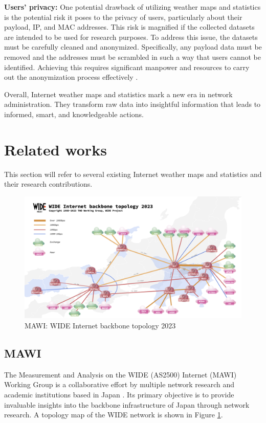 \documentclass[sigconf,authorversion,nonacm]{acmart}
\begin{document}
\textbf{Users' privacy:} One potential drawback of utilizing weather maps and statistics is the potential risk it poses to the privacy of users, particularly about their payload, IP, and MAC addresses. This risk is magnified if the collected datasets are intended to be used for research purposes. To address this issue, the datasets must be carefully cleaned and anonymized. Specifically, any payload data must be removed and the addresses must be scrambled in such a way that users cannot be identified. Achieving this requires significant manpower and resources to carry out the anonymization process effectively \cite{271335}.

Overall, Internet weather maps and statistics mark a new era in network administration. They transform raw data into insightful information that leads to informed, smart, and knowledgeable actions.

\section{Related works}
This section will refer to several existing Internet weather maps and statistics and their research contributions.
\begin{figure}[H]
    \centering
    \includegraphics[width=\linewidth]{MAWI/wide topology.png}
    \caption{MAWI: WIDE Internet backbone topology 2023}
    \label{MAWI: WIDE Internet backbone topology 2023}
\end{figure}

\subsection{MAWI} The Measurement and Analysis on the WIDE (AS2500) Internet (MAWI) Working Group is a collaborative effort by multiple network research and academic institutions based in Japan \cite{271335}. Its primary objective is to provide invaluable insights into the backbone infrastructure of Japan through network research. A topology map of the WIDE network is shown in Figure \ref{MAWI: WIDE Internet backbone topology 2023}.
\end{document}
